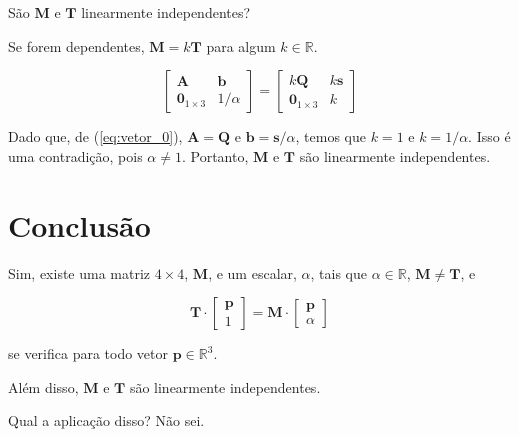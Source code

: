 \documentclass[a4paper]{article}
\begin{document}
São $\mathbf{M}$ e $\mathbf{T}$ linearmente independentes?

Se forem dependentes, $\mathbf{M} = k\mathbf{T}$ para algum $k \in \mathbb{R}$.

\begin{equation}
    \begin{bmatrix}
        \mathbf{A} & \mathbf{b} \\
        \mathbf{0}_{1\times 3} & 1/\alpha
    \end{bmatrix} =
    \begin{bmatrix}
        k\mathbf{Q} & k\mathbf{s} \\
        \mathbf{0}_{1\times 3} & k
    \end{bmatrix}
\end{equation}

Dado que, de (\ref{eq:vetor_0}), $\mathbf{A} = \mathbf{Q}$ e $\mathbf{b} = \mathbf{s}/\alpha$, temos que $k = 1$ e $k = 1/\alpha$. Isso é uma contradição, pois $\alpha \neq 1$. Portanto, $\mathbf{M}$ e $\mathbf{T}$ são linearmente independentes.

\section{Conclusão}

Sim, existe uma matriz $4 \times 4$, $\mathbf{M}$, e um escalar, $\alpha$, tais que $\alpha \in \mathbb{R}$, $\mathbf{M} \neq \mathbf{T}$, e

\begin{equation}
    \mathbf{T}\cdot\begin{bmatrix}\mathbf{p} \\ 1\end{bmatrix} = \mathbf{M}\cdot\begin{bmatrix}\mathbf{p} \\ \alpha\end{bmatrix}
\end{equation}

se verifica para todo vetor $\mathbf{p} \in \mathbb{R}^3$.

Além disso, $\mathbf{M}$ e $\mathbf{T}$ são linearmente independentes.

Qual a aplicação disso? Não sei.
\end{document}

